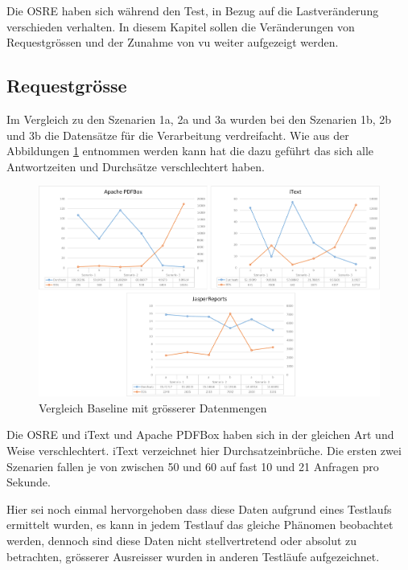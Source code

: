 \documentclass[main.tex]{subfiles}
\begin{document}
Die OSRE haben sich während den Test, in Bezug auf die Lastveränderung verschieden verhalten. In diesem Kapitel sollen die Veränderungen von Requestgrössen und der Zunahme von \acrfull{vu} weiter aufgezeigt werden. 

\subsection{Requestgrösse}

Im Vergleich zu den Szenarien 1a, 2a und 3a wurden bei den Szenarien 1b, 2b und 3b die Datensätze für die Verarbeitung verdreifacht. Wie aus der Abbildungen \ref{figure:vglABRequ} entnommen werden kann hat die dazu geführt das sich alle Antwortzeiten und Durchsätze verschlechtert haben.

\begin{figure}[!hb]
\includegraphics[width=\textwidth]{mainpart/4_analyse_img/ABAuswertung.png}
 \caption{Vergleich Baseline mit grösserer Datenmengen}
 \label{figure:vglABRequ}
\end{figure}

Die OSRE und iText und Apache PDFBox haben sich in der gleichen Art und Weise verschlechtert. iText verzeichnet hier  Durchsatzeinbrüche. Die ersten zwei Szenarien fallen je von zwischen 50 und 60 auf  fast 10 und 21 Anfragen pro Sekunde. 

Hier sei noch einmal hervorgehoben dass diese Daten aufgrund eines Testlaufs ermittelt wurden, es kann in jedem Testlauf das gleiche Phänomen beobachtet werden, dennoch sind diese Daten nicht stellvertretend oder absolut zu betrachten, grösserer Ausreisser wurden in anderen Testläufe aufgezeichnet.
\end{document}
